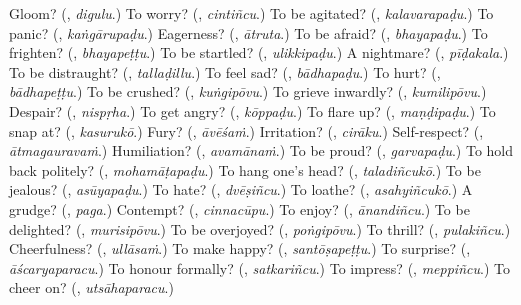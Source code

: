 \begin{tcolorbox}[breakable,colback=teal!4,colframe=teal!35!black,title={Before you move on}]
Gloom? (\textbf{}, \emph{digulu}.) To worry? (\textbf{}, \emph{cintiñcu}.) To be agitated? (\textbf{}, \emph{kalavarapaḍu}.) To panic? (\textbf{}, \emph{kaṅgārupaḍu}.) Eagerness? (\textbf{}, \emph{ātruta}.) To be afraid? (\textbf{}, \emph{bhayapaḍu}.) To frighten? (\textbf{}, \emph{bhayapeṭṭu}.) To be startled? (\textbf{}, \emph{ulikkipaḍu}.) A nightmare? (\textbf{}, \emph{pīḍakala}.) To be distraught? (\textbf{}, \emph{tallaḍillu}.) To feel sad? (\textbf{}, \emph{bādhapaḍu}.) To hurt? (\textbf{}, \emph{bādhapeṭṭu}.) To be crushed? (\textbf{}, \emph{kuṅgipōvu}.) To grieve inwardly? (\textbf{}, \emph{kumilipōvu}.) Despair? (\textbf{}, \emph{nispṛha}.) To get angry? (\textbf{}, \emph{kōppaḍu}.) To flare up? (\textbf{}, \emph{maṇḍipaḍu}.) To snap at? (\textbf{}, \emph{kasurukō}.) Fury? (\textbf{}, \emph{āvēśaṁ}.) Irritation? (\textbf{}, \emph{cirāku}.) Self-respect? (\textbf{}, \emph{ātmagauravaṁ}.) Humiliation? (\textbf{}, \emph{avamānaṁ}.) To be proud? (\textbf{}, \emph{garvapaḍu}.) To hold back politely? (\textbf{}, \emph{mohamāṭapaḍu}.) To hang one's head? (\textbf{}, \emph{taladiñcukō}.) To be jealous? (\textbf{}, \emph{asūyapaḍu}.) To hate? (\textbf{}, \emph{dvēṣiñcu}.) To loathe? (\textbf{}, \emph{asahyiñcukō}.) A grudge? (\textbf{}, \emph{paga}.) Contempt? (\textbf{}, \emph{cinnacūpu}.) To enjoy? (\textbf{}, \emph{ānandiñcu}.) To be delighted? (\textbf{}, \emph{murisipōvu}.) To be overjoyed? (\textbf{}, \emph{poṅgipōvu}.) To thrill? (\textbf{}, \emph{pulakiñcu}.) Cheerfulness? (\textbf{}, \emph{ullāsaṁ}.) To make happy? (\textbf{}, \emph{santōṣapeṭṭu}.) To surprise? (\textbf{}, \emph{āścaryaparacu}.) To honour formally? (\textbf{}, \emph{satkariñcu}.) To impress? (\textbf{}, \emph{meppiñcu}.) To cheer on? (\textbf{}, \emph{utsāhaparacu}.)
\end{tcolorbox}
